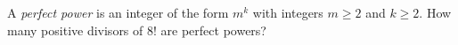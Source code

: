 A \emph{perfect power} is an integer of the form $m^k$ with integers $m\ge2$ and $k\ge2$. How many positive divisors of $8!$ are perfect powers?

